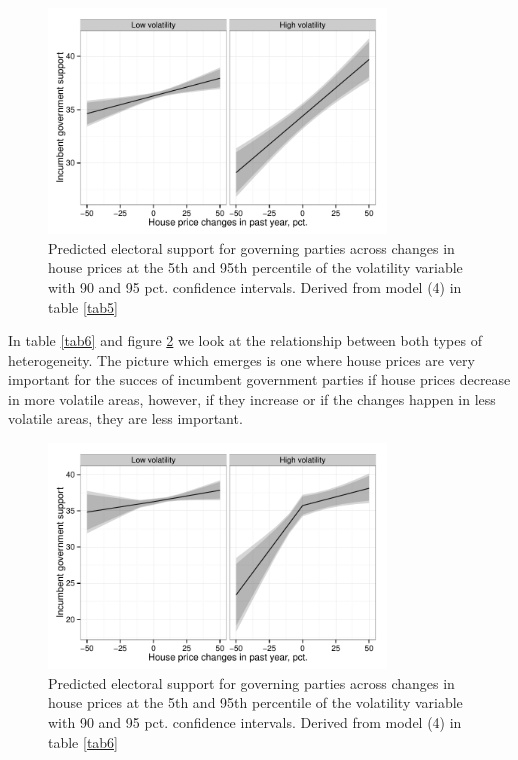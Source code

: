 \documentclass[12pt,a4paper]{article}
\begin{document}
\begin{figure}[htbp]
	\includegraphics[page=1,width=0.8\textwidth]{../figures/volaplot}
	\centering
	\caption{Predicted electoral support for governing parties across changes in house prices at the 5th and 95th percentile of the volatility variable with 90 and 95 pct. confidence intervals. Derived from model (4) in table \ref{tab5}}
	\label{vola}
\end{figure}


In table \ref{tab6} and figure \ref{volaposneg} we look at the relationship between both types of heterogeneity. The picture which emerges is one where house prices are very important for the succes of incumbent government parties if house prices decrease in more volatile areas, however, if they increase or if the changes happen in less volatile areas, they are less important.



\begin{figure}[htbp]
	\includegraphics[width=0.8\textwidth]{../figures/volaposnegplot}
	\centering
	\caption{Predicted electoral support for governing parties across changes in house prices at the 5th and 95th percentile of the volatility variable with 90 and 95 pct. confidence intervals. Derived from model (4) in table \ref{tab6}}
	\label{volaposneg}
\end{figure}
\end{document}
